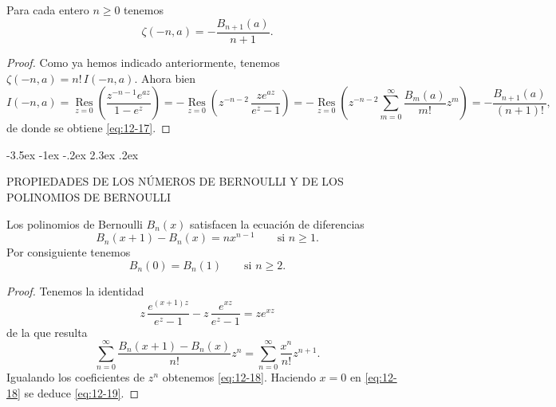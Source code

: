 \documentclass[12pt,a4paper]{book}
\makeatletter
\renewcommand\section{\@startsection{section}{1}{\z@}%
  {-3.5ex \@plus -1ex \@minus -.2ex}%
  {2.3ex \@plus .2ex}%
  {\normalfont\Large\bfseries\raggedright}}
\makeatother
\begin{document}
    \begin{teorema}\label{teo:12-13}
        Para cada entero $n\geq0$ tenemos
        \begin{equation}\label{eq:12-17}
            \zeta(-n,a)=-\frac{B_{n+1}(a)}{n+1}.
        \end{equation}
    \end{teorema}

    \begin{proof}
        Como ya hemos indicado anteriormente, tenemos $\zeta(-n,a)=n!\,I(-n,a)$. Ahora bien
        \begin{equation*}
            I(-n,a)=\operatorname*{Res}_{z=0}\left(\frac{z^{-n-1}e^{az}}{1-e^{z}}\right)=-\operatorname*{Res}_{z=0}\left(z^{-n-2}\,\frac{ze^{az}}{e^{z}-1}\right)
            =-\operatorname*{Res}_{z=0}\left(z^{-n-2}\sum_{m=0}^{\infty}\frac{B_{m}(a)}{m!}z^{m}\right)=-\frac{B_{n+1}(a)}{(n+1)!},
        \end{equation*}
        de donde se obtiene \eqref{eq:12-17}.
    \end{proof}

    \section{PROPIEDADES DE LOS NÚMEROS DE BERNOULLI Y DE LOS POLINOMIOS DE BERNOULLI}
    \begin{teorema}\label{teo:12-14}
        Los polinomios de Bernoulli $B_{n}(x)$ satisfacen la ecuación de diferencias
        \begin{equation}\label{eq:12-18}
            B_{n}(x+1)-B_{n}(x)=nx^{n-1}\qquad\text{si }n\geq1.
        \end{equation}
        Por consiguiente tenemos
        \begin{equation}\label{eq:12-19}
            B_{n}(0)=B_{n}(1)\qquad\text{si }n\geq2.
        \end{equation}
    \end{teorema}

    \begin{proof}
        Tenemos la identidad
        \begin{equation*}
            z\,\frac{e^{(x+1)z}}{e^{z}-1}-z\,\frac{e^{xz}}{e^{z}-1}=ze^{xz}
        \end{equation*}
        de la que resulta
        \begin{equation*}
            \sum_{n=0}^{\infty}\frac{B_{n}(x+1)-B_{n}(x)}{n!}z^{n}=\sum_{n=0}^{\infty}\frac{x^{n}}{n!}z^{n+1}.
        \end{equation*}
        Igualando los coeficientes de $z^{n}$ obtenemos \eqref{eq:12-18}. Haciendo $x=0$ en
        \eqref{eq:12-18} se deduce \eqref{eq:12-19}.
    \end{proof}
\end{document}
